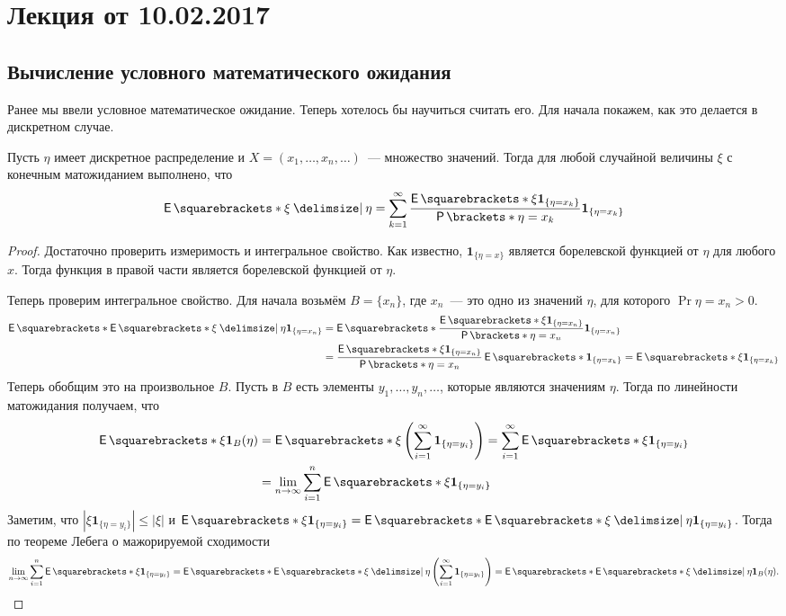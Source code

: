 \section{Лекция от 10.02.2017}
\subsection{Вычисление условного математического ожидания}
Ранее мы ввели условное математическое ожидание. Теперь хотелось бы научиться считать его. Для начала покажем, как это делается в дискретном случае.
\begin{theorem}
	Пусть \(\eta\) имеет дискретное распределение и \(X = (x_1, \dots, x_n, 
	\dots)\)~--- множество значений. Тогда для любой случайной величины \(\xi\) с конечным матожиданием
	выполнено, что
	\[
		\E{\xi \given \eta} = \sum_{k = 1}^{\infty} 
		\frac{\E{\xi\mathbf{1}_{\{\eta = x_{k}\}}}}{\Pr{\eta = x_{k}}} 
		\mathbf{1}_{\{\eta = x_{k}\}}
	\]
\end{theorem}
\begin{proof}
	Достаточно проверить измеримость и интегральное свойство. Как известно, \(\mathbf{1}_{\{\eta = x\}}\) является борелевской функцией от \(\eta\) для любого \(x\). Тогда функция в правой части является борелевской функцией от \(\eta\).
	
	Теперь проверим интегральное свойство. Для начала возьмём \(B = \{x_n\}\), где \(x_n\)~--- это одно из значений \(\eta\), для которого \(\Pr{\eta = x_n} > 0\).
	\begin{align*}
		\E{\E{\xi \given \eta}\mathbf{1}_{\{\eta = x_{n}\}}} &= \E{\frac{\E{\xi 
		\mathbf{1}_{\{\eta = x_{n}\}}}}{\Pr{\eta = x_n}} \mathbf{1}_{\{\eta = 
		x_{n}\}}} \\
		&= \frac{\E{\xi\mathbf{1}_{\{\eta = x_{n}\}}}}{\Pr{\eta = 
		x_n}}\E{\mathbf{1}_{\{\eta = x_{k}\}}} = \E{\xi\mathbf{1}_{\{\eta = 
		x_{k}\}}}
	\end{align*}
	Теперь обобщим это на произвольное \(B\). Пусть в \(B\) есть элементы 
	\(y_{1}, \dots, y_{n}, \dots\), которые являются значениям \(\eta\). Тогда 
	по линейности матожидания получаем, что
	\begin{align*}
		\E{\xi\mathbf{1}_{B}(\eta)} &= \E{\xi\left(\sum_{i = 1}^{\infty} 
		\mathbf{1}_{\{\eta = y_{i}\}}\right)} = \sum_{i = 1}^{\infty} \E{\xi 
		\mathbf{1}_{\{\eta = y_{i}\}}} \\
		&= \lim\limits_{n \to \infty} \sum_{i = 1}^{n} \E{\xi 
		\mathbf{1}_{\{\eta = y_{i}\}}}
	\end{align*}
	Заметим, что \(|\xi \mathbf{1}_{\{\eta = y_{i}\}}| \leq |\xi|\) и \(\E{\xi 
	\mathbf{1}_{\{\eta = y_{i}\}}} = \E{\E{\xi \given \eta}\mathbf{1}_{\{\eta = 
	y_{i}\}}}\). Тогда по теореме Лебега о мажорируемой сходимости
	\[
		\lim\limits_{n \to \infty} \sum_{i = 1}^{n} \E{\xi \mathbf{1}_{\{\eta = 
		y_{i}\}}} = \E{\E{\xi \given \eta} \left(\sum_{i = 1}^{\infty} 
		\mathbf{1}_{\{\eta = y_{i}\}}\right)} = \E{\E{\xi \given \eta} 
		\mathbf{1}_{B}(\eta)}.\qedhere
	\]
\end{proof}


